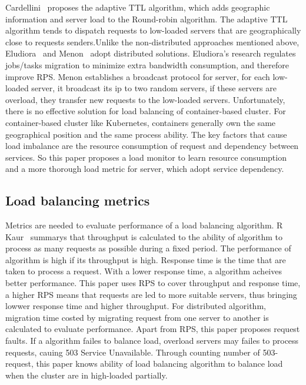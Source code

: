 Cardellini~{\cite{Cardellini2015Dynamic}} proposes the adaptive TTL algorithm, which adds geographic information and server load to the Round-robin algorithm. The adaptive TTL algorithm tends to dispatch requests to low-loaded servers that are geographically close to requests senders.Unlike the non-distributed approaches mentioned above, Eludiora~{\cite{Eludiora2010A}} and Menon~{\cite{Menon2013A}} adopt distributed solutions. Eludiora's research regulates jobs/tasks migration to minimize extra bandwidth consumption, and therefore improve RPS. Menon establishes a broadcast protocol for server, for each low-loaded server, it broadcast its ip to two random servers, if these servers are overload, they transfer new requests to the low-loaded servers.
Unfortunately, there is no effective solution for load balancing of container-based cluster. For container-based cluster like Kubernetes, containers generally own the same geographical position and the same process ability. The key factors that cause load imbalance are the resource consumption of request and dependency between services. So this paper proposes a load monitor to learn resource consumption and a more thorough load metric for server, which adopt service dependency.
\subsection{Load balancing metrics}

Metrics are needed to evaluate performance of a load balancing algorithm. R Kaur~{\cite{Kaur2014Load}} summarys that throughput is calculated to the ability of algorithm to process as many requests as possible during a fixed period. The performance of algorithm is high if its throughput is high. Response time is the time that are taken to process a request. With a lower response time, a algorithm acheives better performance. This paper uses RPS to cover throughput and response time, a higher RPS means that requests are led to more suitable servers, thus bringing lowwer response time and higher throughput. For distributed algorithm, migration time costed by migrating request from one server to another is calculated to evaluate performance. Apart from RPS, this paper proposes request faults. If a algorithm failes to balance load, overload servers may failes to process requests, cauing 503 Service Unavailable. Through counting number of 503-request, this paper knows ability of load balancing algorithm to balance load when the cluster are in high-loaded partially.
